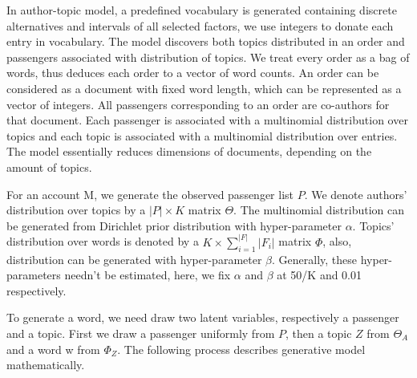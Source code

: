 \documentclass{llncs}
\begin{document}
In author-topic model\cite{deiv:corpora}, a predefined vocabulary is generated containing discrete alternatives and intervals of all selected factors, we use integers to donate each entry in vocabulary. The model discovers both topics distributed in an order and passengers associated with distribution of topics. We treat every order as a bag of words, thus deduces each order to a vector of word counts. An order can be considered as a document with fixed word length, which can be represented as a vector of integers. All passengers corresponding to an order are co-authors for that document. Each passenger is associated with a multinomial distribution over topics and each topic is associated with a multinomial distribution over entries. The model essentially reduces dimensions of documents, depending on the amount of topics.\par

For an account M, we generate the observed passenger list $P$. We denote authors' distribution over topics by a $|P| \times K$ matrix $\Theta$. The multinomial distribution can be generated from Dirichlet prior distribution with hyper-parameter $\alpha$. Topics' distribution over words is denoted by a $K \times \sum_{i=1}^{|F|}|F_i| $  matrix $\Phi$, also, distribution can be generated with hyper-parameter $\beta$. Generally, these hyper-parameters needn't be estimated, here, we fix $\alpha$ and $\beta$ at 50/K and 0.01 respectively. \par

To generate a word, we need draw two latent variables, respectively a passenger and a topic. First we draw a passenger uniformly from $P$, then a topic $Z$ from $\Theta_A$ and a word w from $\Phi_Z$. The following process describes generative model mathematically.\par
\end{document}
